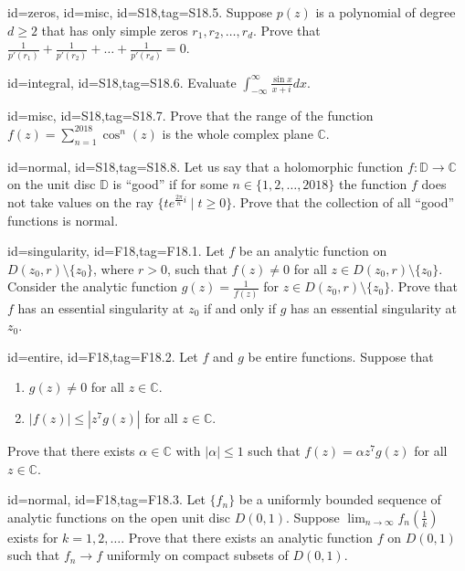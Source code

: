 \documentclass[12pt,letterpaper]{article}
\begin{document}
{\item[id=zeros, id=misc, id=S18,tag=S18.5.]
Suppose $p(z)$ is a polynomial of degree $d \ge 2$ that has only simple zeros $r_1,r_2,\ldots, r_d$. Prove that $\frac{1}{p'(r_1)} + \frac{1}{p'(r_2)} + \ldots + \frac{1}{p'(r_d)} = 0$.

\item[id=integral, id=S18,tag=S18.6.]
Evaluate $\int_{-\infty}^{\infty} \frac{\sin x}{x + i} dx$.

\item[id=misc, id=S18,tag=S18.7.]
Prove that the range of the function $f(z) = \sum_{n=1}^{2018} \cos^n(z)$ is the whole complex plane $\mathbb{C}$.

\item[id=normal, id=S18,tag=S18.8.]
Let us say that a holomorphic function $f : \mathbb{D} \rightarrow \mathbb{C}$ on the unit disc $\mathbb{D}$ is ``good'' if for some $n \in \{1,2,\ldots,2018\}$ the function $f$ does not take values on the ray $\{t e^{\frac{2\pi}{n} i} \mid t \ge 0\}$. Prove that the collection of all ``good'' functions is normal.


\item[id=singularity, id=F18,tag=F18.1.]
Let $f$ be an analytic function on $D(z_0, r) \setminus \{z_0\}$, where $r > 0$, such that $f(z) \ne 0$ for all $z \in D(z_0, r) \setminus \{z_0\}$. Consider the analytic function $g(z) = \frac{1}{f(z)}$ for $z \in D(z_0, r) \setminus \{z_0\}$. Prove that $f$ has an essential singularity at $z_0$ if and only if $g$ has an essential singularity at $z_0$.
\item[id=entire, id=F18,tag=F18.2.]
Let $f$ and $g$ be entire functions. Suppose that
\begin{enumerate}[label=(\alph*)]\onlyitems
\item $g(z) \ne 0$ for all $z \in \mathbb{C}$.
\item $| f(z) | \le | z^7 g(z) |$ for all $z \in \mathbb{C}$.
\end{enumerate}
Prove that there exists $\alpha \in \mathbb{C}$ with $| \alpha | \le 1$ such that $f(z) = \alpha z^7 g(z)$ for all $z \in \mathbb{C}$.
\item[id=normal, id=F18,tag=F18.3.]
Let $\{f_n\}$ be a uniformly bounded sequence of analytic functions on the open unit disc $D(0,1)$. Suppose $\lim_{n\rightarrow \infty} f_n(\frac{1}{k})$ exists for $k = 1,2,\ldots$. Prove that there exists an analytic function $f$ on $D(0,1)$ such that $f_n \rightarrow f$ uniformly on compact subsets of $D(0,1)$.

}
\end{document}
